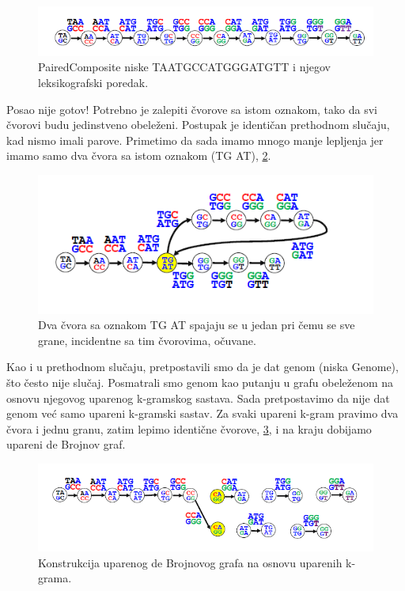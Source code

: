 \begin{figure}[H]
	\centering
	\includegraphics[width=1\textwidth]{poglavlja/3/slike/upareni_debrojnov.png}
	\caption{PairedComposite niske TAATGCCATGGGATGTT i njegov leksikografski poredak.}
	\label{slika:upareniDeBrojnov}
\end{figure} 

Posao nije gotov! Potrebno je zalepiti čvorove sa istom oznakom, tako da svi čvorovi budu jedinstveno obeleženi. Postupak je identičan prethodnom slučaju, kad nismo imali parove. Primetimo da sada imamo mnogo manje lepljenja jer imamo samo dva čvora sa istom oznakom (TG AT), \ref{slika:uparenoLepljenje}.


\begin{figure}[H]
	\centering
	\includegraphics[width=1\textwidth]{poglavlja/3/slike/upareno_lepljenje.png}
	\caption{Dva čvora sa oznakom TG AT spajaju se u jedan pri čemu se sve grane, incidentne sa tim čvorovima, očuvane.}
	\label{slika:uparenoLepljenje}
\end{figure} 


Kao i u prethodnom slučaju, pretpostavili smo da je dat genom (niska Genome), što često nije slučaj. Posmatrali smo genom kao putanju u grafu obeleženom na osnovu njegovog uparenog k-gramskog sastava. Sada pretpostavimo da nije dat genom već samo upareni k-gramski sastav. Za svaki upareni k-gram pravimo dva čvora i jednu granu, zatim lepimo identične čvorove, \ref{slika:uparenoLepljenje2}, i na kraju dobijamo upareni de Brojnov graf.


\begin{figure}[H]
	\centering
	\includegraphics[width=1\textwidth]{poglavlja/3/slike/upareno_lepljenje2.png}
	\caption{Konstrukcija uparenog de Brojnovog grafa na osnovu uparenih k-grama.}
	\label{slika:uparenoLepljenje2}
\end{figure} 


